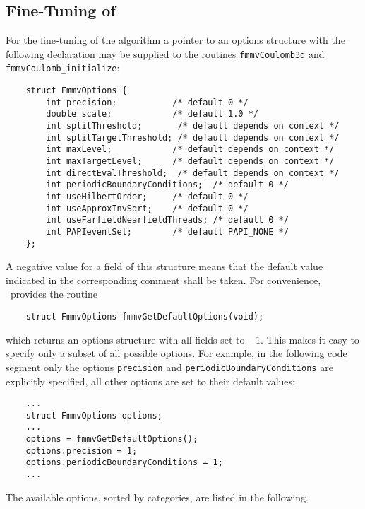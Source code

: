 \subsection{Fine-Tuning of \fmmv}\label{options}
For the fine-tuning of the algorithm 
a pointer to an options structure with the following
declaration may be supplied to the routines
\verb|fmmvCoulomb3d| and \verb|fmmvCoulomb_initialize|:
\begin{verbatim}
    struct FmmvOptions {
        int precision;           /* default 0 */
        double scale;            /* default 1.0 */
        int splitThreshold;       /* default depends on context */
        int splitTargetThreshold; /* default depends on context */
        int maxLevel;            /* default depends on context */
        int maxTargetLevel;      /* default depends on context */
        int directEvalThreshold;  /* default depends on context */
        int periodicBoundaryConditions;  /* default 0 */
        int useHilbertOrder;     /* default 0 */
        int useApproxInvSqrt;    /* default 0 */
        int useFarfieldNearfieldThreads; /* default 0 */
        int PAPIeventSet;        /* default PAPI_NONE */
    };
\end{verbatim}
A negative value for a field of this structure means that the 
default value indicated in the corresponding comment  
shall be taken.
For convenience, \fmmv\ provides the routine 
\begin{verbatim}
    struct FmmvOptions fmmvGetDefaultOptions(void);
\end{verbatim}
which returns an options structure with all fields set to
$-1$. This makes it easy to specify only 
a subset of all possible options. 
For example, in the following code segment
only the options \verb|precision| 
and \verb|periodicBoundaryConditions| are explicitly specified, all other options 
are set to their default values: 
\begin{verbatim}
    ...
    struct FmmvOptions options;
    ...
    options = fmmvGetDefaultOptions();
    options.precision = 1;
    options.periodicBoundaryConditions = 1;
    ...
\end{verbatim}    
The available options, sorted by categories, are listed in the following.

